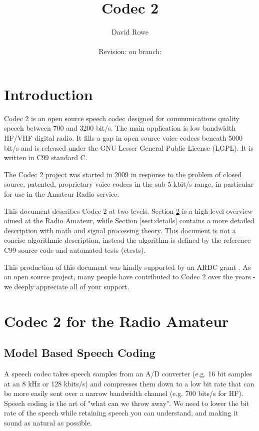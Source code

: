 \documentclass{article}
\title{Codec 2}
\author{David Rowe\\ \\ Revision: {\gitrevision} on branch: {\branch}}
\begin{document}
\maketitle

\section{Introduction}

Codec 2 is an open source speech codec designed for communications quality speech between 700 and 3200 bit/s. The main application is low bandwidth HF/VHF digital radio. It fills a gap in open source voice codecs beneath 5000 bit/s and is released under the GNU Lesser General Public License (LGPL).  It is written in C99 standard C.

The Codec 2 project was started in 2009 in response to the problem of closed source, patented, proprietary voice codecs in the sub-5 kbit/s range, in particular for use in the Amateur Radio service.

This document describes Codec 2 at two levels.  Section \ref{sect:overview} is a high level overview aimed at the Radio Amateur, while Section \ref{sect:details} contains a more detailed description with math and signal processing theory. This document is not a concise algorithmic description, instead the algorithm is defined by the reference C99 source code and automated tests (ctests).

This production of this document was kindly supported by an ARDC grant \cite{ardc2023}.  As an open source project, many people have contributed to Codec 2 over the years - we deeply appreciate all of your support.

\section{Codec 2 for the Radio Amateur}
\label{sect:overview}

\subsection{Model Based Speech Coding}

A speech codec takes speech samples from an A/D converter (e.g. 16 bit samples at an 8 kHz or 128 kbits/s) and compresses them down to a low bit rate that can be more easily sent over a narrow bandwidth channel (e.g. 700 bits/s for HF).  Speech coding is the art of "what can we throw away". We need to lower the bit rate of the speech while retaining speech you can understand, and making it sound as natural as possible.
\end{document}

